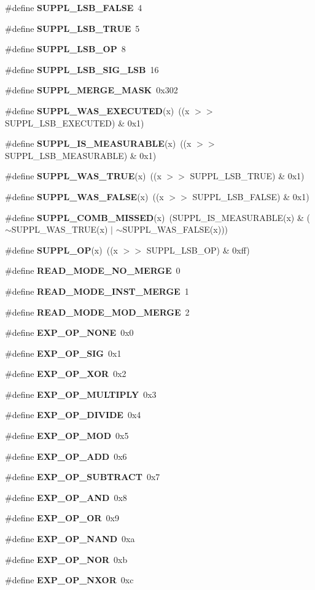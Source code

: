 \begin{CompactItemize}
\#define {\bf SUPPL\_\-LSB\_\-FALSE}\ 4
\item 
\#define {\bf SUPPL\_\-LSB\_\-TRUE}\ 5
\item 
\#define {\bf SUPPL\_\-LSB\_\-OP}\ 8
\item 
\#define {\bf SUPPL\_\-LSB\_\-SIG\_\-LSB}\ 16
\item 
\#define {\bf SUPPL\_\-MERGE\_\-MASK}\ 0x302
\item 
\#define {\bf SUPPL\_\-WAS\_\-EXECUTED}(x)\ ((x $>$$>$ SUPPL\_\-LSB\_\-EXECUTED) \& 0x1)
\item 
\#define {\bf SUPPL\_\-IS\_\-MEASURABLE}(x)\ ((x $>$$>$ SUPPL\_\-LSB\_\-MEASURABLE) \& 0x1)
\item 
\#define {\bf SUPPL\_\-WAS\_\-TRUE}(x)\ ((x $>$$>$ SUPPL\_\-LSB\_\-TRUE) \& 0x1)
\item 
\#define {\bf SUPPL\_\-WAS\_\-FALSE}(x)\ ((x $>$$>$ SUPPL\_\-LSB\_\-FALSE) \& 0x1)
\item 
\#define {\bf SUPPL\_\-COMB\_\-MISSED}(x)\ (SUPPL\_\-IS\_\-MEASURABLE(x) \& ($\sim$SUPPL\_\-WAS\_\-TRUE(x) $|$ $\sim$SUPPL\_\-WAS\_\-FALSE(x)))
\item 
\#define {\bf SUPPL\_\-OP}(x)\ ((x $>$$>$ SUPPL\_\-LSB\_\-OP) \& 0xff)
\item 
\#define {\bf READ\_\-MODE\_\-NO\_\-MERGE}\ 0
\item 
\#define {\bf READ\_\-MODE\_\-INST\_\-MERGE}\ 1
\item 
\#define {\bf READ\_\-MODE\_\-MOD\_\-MERGE}\ 2
\item 
\#define {\bf EXP\_\-OP\_\-NONE}\ 0x0
\item 
\#define {\bf EXP\_\-OP\_\-SIG}\ 0x1
\item 
\#define {\bf EXP\_\-OP\_\-XOR}\ 0x2
\item 
\#define {\bf EXP\_\-OP\_\-MULTIPLY}\ 0x3
\item 
\#define {\bf EXP\_\-OP\_\-DIVIDE}\ 0x4
\item 
\#define {\bf EXP\_\-OP\_\-MOD}\ 0x5
\item 
\#define {\bf EXP\_\-OP\_\-ADD}\ 0x6
\item 
\#define {\bf EXP\_\-OP\_\-SUBTRACT}\ 0x7
\item 
\#define {\bf EXP\_\-OP\_\-AND}\ 0x8
\item 
\#define {\bf EXP\_\-OP\_\-OR}\ 0x9
\item 
\#define {\bf EXP\_\-OP\_\-NAND}\ 0xa
\item 
\#define {\bf EXP\_\-OP\_\-NOR}\ 0xb
\item 
\#define {\bf EXP\_\-OP\_\-NXOR}\ 0xc
$$
\end{CompactItemize}
